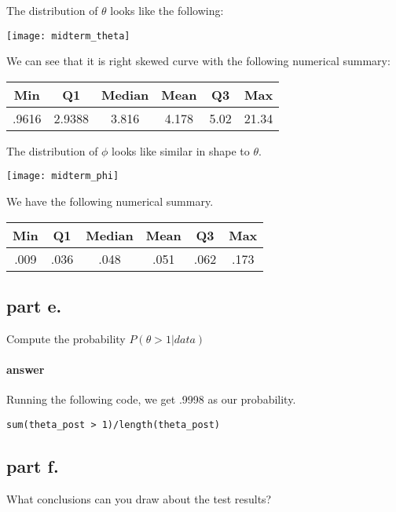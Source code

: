 \documentclass[12pt,a4paper]{article}
\begin{document}
The distribution of $\theta$ looks like the following:

\begin{center}
\texttt{[image: midterm\_theta]}
\end{center}

We can see that it is right skewed curve with the following numerical summary:

\begin{center}
\begin{tabular}{|| c | c | c | c | c | c ||}
\hline
Min & Q1 & Median & Mean & Q3 & Max \\
\hline
.9616 & 2.9388 & 3.816 & 4.178 & 5.02 & 21.34 \\
\hline
\end{tabular}
\end{center}

The distribution of $\phi$ looks like similar in shape to $\theta$.

\begin{center}
\texttt{[image: midterm\_phi]}
\end{center}

We have the following numerical summary.

\begin{center}
\begin{tabular}{|| c | c | c | c | c | c ||}
\hline
Min & Q1 & Median & Mean & Q3 & Max \\
\hline
.009 & .036 & .048 & .051 & .062 & .173 \\
\hline
\end{tabular}
\end{center}

\subsection{part e.}
Compute the probability $P(\theta > 1 | data)$

\paragraph{answer}
Running the following code, we get .9998 as our probability.

\begin{lstlisting}
sum(theta_post > 1)/length(theta_post)
\end{lstlisting}

\subsection{part f.}
What conclusions can you draw about the test results?
\end{document}
